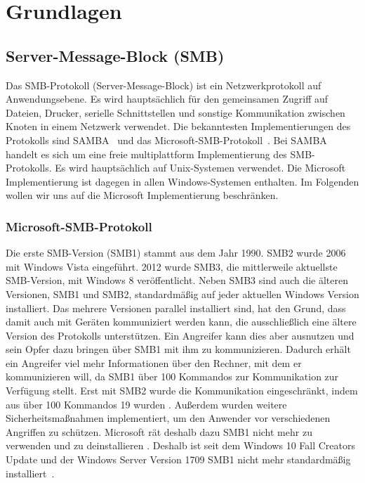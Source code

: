 \documentclass{AIFB_ITI_Crypto_Seminar}
\begin{document}
\section{Grundlagen}
\label{sec:grundlagen}
\subsection{Server-Message-Block (SMB)}
Das SMB-Protokoll (Server-Message-Block) ist ein Netzwerkprotokoll auf Anwendungsebene. Es wird hauptsächlich für den gemeinsamen Zugriff auf Dateien, Drucker, serielle Schnittstellen und sonstige Kommunikation zwischen Knoten in einem Netzwerk verwendet. 
Die bekanntesten Implementierungen des Protokolls sind SAMBA~\cite{samba} und das Microsoft-SMB-Protokoll~\cite{ms_smb}. 
Bei SAMBA handelt es sich um eine freie multiplattform Implementierung des SMB-Protokolls. Es wird hauptsächlich auf Unix-Systemen verwendet. 
Die Microsoft Implementierung ist dagegen in allen Windows-Systemen enthalten. Im Folgenden wollen wir uns auf die Microsoft Implementierung beschränken. 
\subsubsection{Microsoft-SMB-Protokoll}
Die erste SMB-Version (SMB1) stammt aus dem Jahr 1990. SMB2 wurde 2006 mit Windows Vista eingeführt. 2012 wurde SMB3, die mittlerweile aktuellste SMB-Version, mit Windows 8 veröffentlicht. Neben SMB3 sind auch die älteren Versionen, SMB1 und SMB2, standardmäßig auf jeder aktuellen Windows Version installiert. Das mehrere Versionen parallel installiert sind, hat den Grund, dass damit auch mit Geräten kommuniziert werden kann, die ausschließlich eine ältere Version des Protokolls unterstützen. Ein Angreifer kann dies aber ausnutzen und sein Opfer dazu bringen über SMB1 mit ihm zu kommunizieren. Dadurch erhält ein Angreifer viel mehr Informationen über den Rechner, mit dem er kommunizieren will, da SMB1 über 100 Kommandos zur Kommunikation zur Verfügung stellt. 
Erst mit SMB2 wurde die Kommunikation eingeschränkt, indem aus über 100 Kommandos 19 wurden \cite{smb1_smb2}. Außerdem wurden weitere Sicherheitsmaßnahmen implementiert, um den Anwender vor verschiedenen Angriffen zu schützen. Microsoft rät deshalb dazu SMB1 nicht mehr zu verwenden und zu deinstallieren \cite{smb1_stop}. Deshalb ist seit dem Windows 10 Fall Creators Update und der Windows Server Version 1709 SMB1 nicht mehr standardmäßig installiert~\cite{fall_creator}. 
\end{document}
